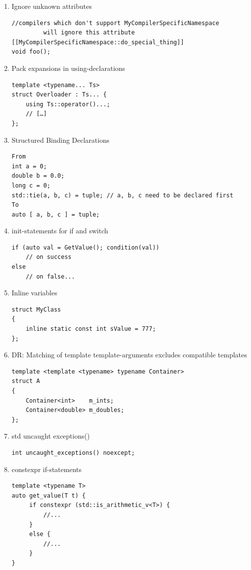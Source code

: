 \documentclass[12pt]{article}
\begin{document}
{\begin{enumerate}
\begin{lstlisting}
void foo() {
                      int x = 42;
                      // Compilers may warn about this
     [[maybe_unused]] int y = 42; 
     				// Warning suppressed
}
\end{lstlisting}
\item Ignore unknown attributes
\begin{lstlisting}
//compilers which don't support MyCompilerSpecificNamespace
		 will ignore this attribute
[[MyCompilerSpecificNamespace::do_special_thing]]
void foo();
\end{lstlisting}
\item Pack expansions in using-declarations
\begin{lstlisting}
template <typename... Ts>
struct Overloader : Ts... {
    using Ts::operator()...;
    // […]
};
\end{lstlisting}
\item Structured Binding Declarations
\begin{lstlisting}
From
int a = 0;
double b = 0.0;
long c = 0;
std::tie(a, b, c) = tuple; // a, b, c need to be declared first
To
auto [ a, b, c ] = tuple;
\end{lstlisting}
\item init-statements for if and switch
\begin{lstlisting}
if (auto val = GetValue(); condition(val))
    // on success
else
    // on false...
\end{lstlisting}
\item Inline variables
\begin{lstlisting}
struct MyClass
{
    inline static const int sValue = 777;
};
\end{lstlisting}
\item DR: Matching of template template-arguments excludes compatible templates
\begin{lstlisting}
template <template <typename> typename Container>
struct A
{
    Container<int>    m_ints;
    Container<double> m_doubles;
};
\end{lstlisting}
\item std uncaught exceptions()
\begin{lstlisting}
int uncaught_exceptions() noexcept;
\end{lstlisting}
\item constexpr if-statements
\begin{lstlisting}
template <typename T>
auto get_value(T t) {
     if constexpr (std::is_arithmetic_v<T>) {
         //...
     }
     else {
         //...
     }
}
\end{lstlisting}




\end{enumerate}

}
\end{document}
